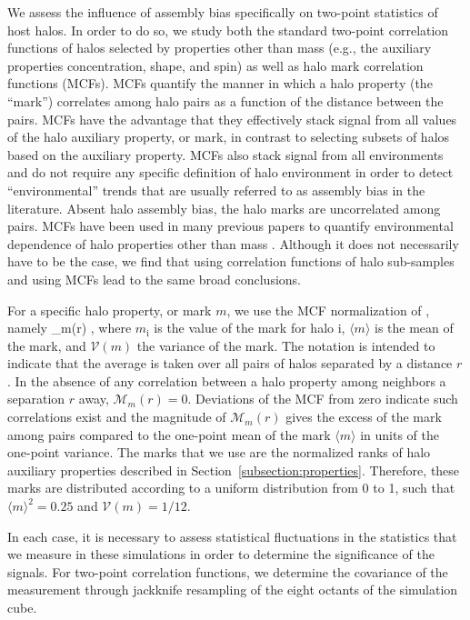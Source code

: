 \documentclass[usenatbib,fleqn]{mnras}
\begin{document}
We assess the influence of assembly bias specifically on two-point statistics of host halos. In order to do so, we 
study both the standard two-point correlation functions of halos selected by properties other than mass 
(e.g., the auxiliary properties concentration, shape, and spin) as well as halo mark correlation functions
(MCFs). MCFs quantify the manner in which a halo property (the ``mark'') correlates among halo pairs as a function of the distance between the pairs. MCFs have the advantage that they effectively stack signal from all values of the halo auxiliary property, or mark, in contrast to selecting subsets of halos based on the auxiliary property. MCFs also stack signal from all environments and do not require any specific definition of halo environment in order to detect ``environmental'' trends that are usually referred to as assembly bias in the literature. Absent halo assembly bias, the halo marks are uncorrelated among pairs. 
MCFs have been used in many previous papers to quantify environmental dependence of halo 
properties other than mass \citep{sheth_tormen04,sheth05, harker_etal06,wechsler_etal06,mao_etal15}. 
Although it does not necessarily have to be the case, we find that using correlation functions of halo sub-samples and using MCFs lead to the same broad conclusions. 


For a specific halo property, or mark $m$, we use the MCF normalization of \citet{wechsler_etal06}, namely 
%
\beq
{}_m(r) \equiv {},
\eeq
%
where $m_{\mathrm{i}}$ is the value of the mark for halo $\mathrm{i}$, $\langle m \rangle$ is the mean of the
mark, and $\mathcal{V}(m)$ the variance of the mark. The notation is intended to indicate that the average is
taken over all pairs of halos separated by a distance $r$. In the absence of any correlation between a halo
property among neighbors a separation $r$ away, $\mathcal{M}_m(r) = 0$. Deviations of the MCF from
zero indicate such correlations exist and the magnitude of $\mathcal{M}_m(r)$ gives the excess of the mark among
pairs compared to the one-point mean of the mark $\langle m\rangle$ in units of the one-point variance. The marks that we use are the normalized ranks of halo auxiliary properties described in Section~\ref{subsection:properties}. Therefore, these marks are distributed according 
to a uniform distribution from 0 to 1, such that $\langle m \rangle^2 = 0.25$ and $\mathcal{V}(m) = 1/12$. 


In each case, it is necessary to assess statistical fluctuations in the statistics that we measure in these simulations in order to determine the significance of the signals. For two-point correlation functions, we determine the covariance of the measurement through jackknife resampling of the eight octants of the simulation cube. 
\end{document}
